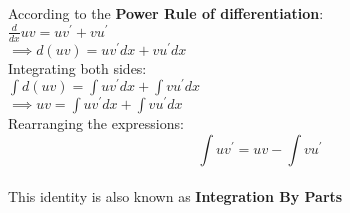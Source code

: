 \documentclass{article}
\begin{document}
According to the \textbf{Power Rule of differentiation}:\\

$ \frac{d}{dx}uv = uv^{\prime} + vu^{\prime} $\\

$ \implies d(uv) = uv^{\prime}dx + vu^{\prime}dx $\\

Integrating both sides:\\

$ \int{d(uv)} = \int{uv^{\prime}dx} + \int{vu^{\prime}dx} $\\

$ \implies uv = \int{uv^{\prime}dx} + \int{vu^{\prime}dx} $\\

Rearranging the expressions:\\

\[
 \boxed{\int{uv^{\prime}}=uv-\int{vu^{\prime}}}
\]\\

This identity is also known as \textbf{Integration By Parts}
\end{document}
